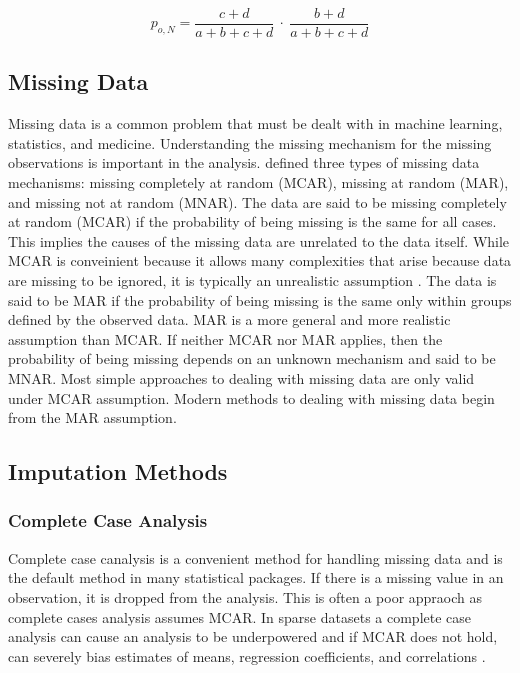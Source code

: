 \documentclass[12pt,]{article}
\begin{document}
\[
p_{o,N} = \frac{c+d}{a+b+c+d} ~\cdot~ \frac{b+d}{a+b+c+d}
\]

\subsection{Missing Data}\label{missing-data}

Missing data is a common problem that must be dealt with in machine
learning, statistics, and medicine. Understanding the missing mechanism
for the missing observations is important in the analysis.
\citep{rubin_inference_1976} defined three types of missing data
mechanisms: missing completely at random (MCAR), missing at random
(MAR), and missing not at random (MNAR). The data are said to be missing
completely at random (MCAR) if the probability of being missing is the
same for all cases. This implies the causes of the missing data are
unrelated to the data itself. While MCAR is conveinient because it
allows many complexities that arise because data are missing to be
ignored, it is typically an unrealistic assumption
\citep{van_buuren_flexible_2012}. The data is said to be MAR if the
probability of being missing is the same only within groups defined by
the observed data. MAR is a more general and more realistic assumption
than MCAR. If neither MCAR nor MAR applies, then the probability of
being missing depends on an unknown mechanism and said to be MNAR. Most
simple approaches to dealing with missing data are only valid under MCAR
assumption. Modern methods to dealing with missing data begin from the
MAR assumption.

\subsection{Imputation Methods}\label{imputation-methods}

\subsubsection{Complete Case Analysis}\label{complete-case-analysis}

Complete case canalysis is a convenient method for handling missing data
and is the default method in many statistical packages. If there is a
missing value in an observation, it is dropped from the analysis. This
is often a poor appraoch as complete cases analysis assumes MCAR. In
sparse datasets a complete case analysis can cause an analysis to be
underpowered and if MCAR does not hold, can severely bias estimates of
means, regression coefficients, and correlations
\citep{van_buuren_flexible_2012}.
\end{document}
